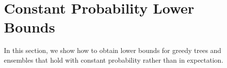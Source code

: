 \documentclass[11pt]{article}
\newcommand{\bx}{\mathbf{x}}
\DeclarePairedDelimiter{\braces}{\lbrace}{\rbrace}
\renewcommand{\P}{\mathbb{P}}
\newcommand{\nsamples}{n}
\newcommand{\featindices}{J}
\newcommand{\splitrule}{\mathcal{R}_{\textnormal{split}}}
\newcommand{\modifieddata}{\check{\mathcal{D}}_\nsamples}
\newcommand{\traversal}{T}
\begin{document}


\section{Constant Probability Lower Bounds}
\label{sec:high_prob_lower_bounds}

In this section, we show how to obtain lower bounds for greedy trees and ensembles that hold with constant probability rather than in expectation.
\end{document}
